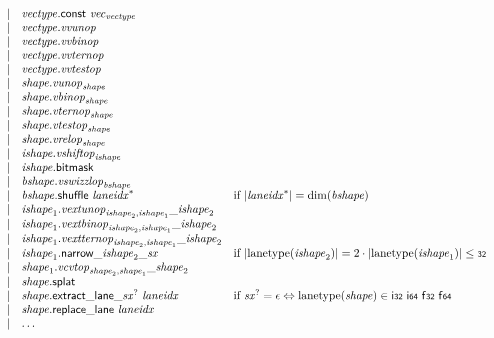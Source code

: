 $$\begin{array}[t]{@{}lrrl@{}l@{}}
& & | & {\mathit{vectype}}{.}\mathsf{const}~{{\mathit{vec}}}_{{\mathit{vectype}}} \\
& & | & {\mathit{vectype}} {.} {\mathit{vvunop}} \\
& & | & {\mathit{vectype}} {.} {\mathit{vvbinop}} \\
& & | & {\mathit{vectype}} {.} {\mathit{vvternop}} \\
& & | & {\mathit{vectype}} {.} {\mathit{vvtestop}} \\
& & | & {\mathit{shape}} {.} {{\mathit{vunop}}}_{{\mathit{shape}}} \\
& & | & {\mathit{shape}} {.} {{\mathit{vbinop}}}_{{\mathit{shape}}} \\
& & | & {\mathit{shape}} {.} {{\mathit{vternop}}}_{{\mathit{shape}}} \\
& & | & {\mathit{shape}} {.} {{\mathit{vtestop}}}_{{\mathit{shape}}} \\
& & | & {\mathit{shape}} {.} {{\mathit{vrelop}}}_{{\mathit{shape}}} \\
& & | & {\mathit{ishape}} {.} {{\mathit{vshiftop}}}_{{\mathit{ishape}}} \\
& & | & {\mathit{ishape}}{.}\mathsf{bitmask} \\
& & | & {\mathit{bshape}} {.} {{\mathit{vswizzlop}}}_{{\mathit{bshape}}} \\
& & | & {\mathit{bshape}}{.}\mathsf{shuffle}~{{\mathit{laneidx}}^\ast} & \quad \mbox{if}~ {|{{\mathit{laneidx}}^\ast}|} = {\mathrm{dim}}({\mathit{bshape}}) \\
& & | & {\mathit{ishape}}_1 {.} {{{\mathit{vextunop}}}_{{\mathit{ishape}}_2, {\mathit{ishape}}_1}}{\mathsf{\_}}{{\mathit{ishape}}_2} \\
& & | & {\mathit{ishape}}_1 {.} {{{\mathit{vextbinop}}}_{{\mathit{ishape}}_2, {\mathit{ishape}}_1}}{\mathsf{\_}}{{\mathit{ishape}}_2} \\
& & | & {\mathit{ishape}}_1 {.} {{{\mathit{vextternop}}}_{{\mathit{ishape}}_2, {\mathit{ishape}}_1}}{\mathsf{\_}}{{\mathit{ishape}}_2} \\
& & | & {{\mathit{ishape}}_1{.}\mathsf{narrow}}{\mathsf{\_}}{{\mathit{ishape}}_2}{\mathsf{\_}}{{\mathit{sx}}} & \quad \mbox{if}~ {|{\mathrm{lanetype}}({\mathit{ishape}}_2)|} = 2 \cdot {|{\mathrm{lanetype}}({\mathit{ishape}}_1)|} \leq \mathsf{{\scriptstyle 32}} \\
& & | & {\mathit{shape}}_1 {.} {{{\mathit{vcvtop}}}_{{\mathit{shape}}_2, {\mathit{shape}}_1}}{\mathsf{\_}}{{\mathit{shape}}_2} \\
& & | & {\mathit{shape}}{.}\mathsf{splat} \\
& & | & {{\mathit{shape}}{.}\mathsf{extract\_lane}}{\mathsf{\_}}{{{\mathit{sx}}^?}}~{\mathit{laneidx}} & \quad \mbox{if}~ {{\mathit{sx}}^?} = \epsilon \Leftrightarrow {\mathrm{lanetype}}({\mathit{shape}}) \in \mathsf{i{\scriptstyle 32}}~\mathsf{i{\scriptstyle 64}}~\mathsf{f{\scriptstyle 32}}~\mathsf{f{\scriptstyle 64}} \\
& & | & {\mathit{shape}}{.}\mathsf{replace\_lane}~{\mathit{laneidx}} \\
& & | & \dots \\
\end{array}
$$

